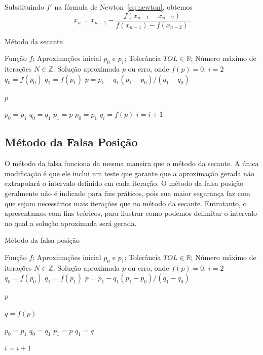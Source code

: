 \documentclass[a4paper, 10pt]{article} %
\newcommand{\R}{\mathbb{R}}
\newcommand{\Z}{\mathbb{Z}}
\theoremstyle{definition}
\theoremstyle{definition}
\numberwithin{equation}{section} %
\numberwithin{lstlisting}{section}
\numberwithin{algorithm}{section}
\numberwithin{table}{section}
\begin{document}
Substituindo $f'$ na fórmula de Newton~\eqref{eq:newton}, obtemos
\begin{equation}
 x_n = x_{n-1} - \frac{f(x_{n-1} - x_{n-2})}{f(x_{n-1}) - f(x_{n-2})}\text{.}
\end{equation}


\begin{algorithm}[H]
  \caption{Método da secante}
  \begin{algorithmic}[1]
   \Require Função $f$; Aproximações inicial $p_0$ e $p_1$; Tolerância $TOL \in \R$; Número máximo de iterações $N \in \Z$.
   \Ensure Solução aproximada $p$ ou erro, onde $f(p) = 0$.
    \State $i=2$
    \State $q_0 = f(p_0)$
    \State $q_1 = f(p_1)$
      \State $p = p_1 - q_1(p_1 - p_0)/(q_1 - q_0)$
      
	\State \Return $p$
      \EndIf
      
      \State $p_0 = p_1$
      \State $q_0 = q_1$
      \State $p_1 = p$
      \State $p_0 = p_1$
      \State $q_i = f(p)$
      \State $i = i+1$
    \EndWhile
    \State {}
   \EndFunction
  \end{algorithmic}
 \end{algorithm}
 
\subsection{Método da Falsa Posição}
 
O método da falsa funciona da mesma maneira que o método da secante. A única modificação é que ele inclui um teste que garante que a aproximação gerada não extrapolará o intervalo definido em cada iteração. O método da falsa posição geralmente não é indicado para fins práticos, pois sua maior segurança faz com que sejam necessários mais iterações que no método da secante. Entratanto, o apresentamos com fins teóricos, para ilustrar como podemos delimitar o intervalo no qual a solução aproximada será gerada.

\begin{algorithm}[H]
  \caption{Método da falsa posição}
  \begin{algorithmic}[1]
   \Require Função $f$; Aproximações inicial $p_0$ e $p_1$; Tolerância $TOL \in \R$; Número máximo de iterações $N \in \Z$.
   \Ensure Solução aproximada $p$ ou erro, onde $f(p) = 0$.
    \State $i=2$
    \State $q_0 = f(p_0)$
    \State $q_1 = f(p_1)$
      \State $p = p_1 - q_1(p_1 - p_0)/(q_1 - q_0)$
      
	\State \Return $p$
      \EndIf
      
      \State $q = f(p)$

	\State $p_0 = p_1$
      	\State $q_0 = q_1$
      \EndIf
      \State $p_1 = p$
      \State $q_1 = q$
      
      \State $i = i+1$
    \EndWhile
    \State {}
   \EndFunction
  \end{algorithmic}
 \end{algorithm}
\end{document}
